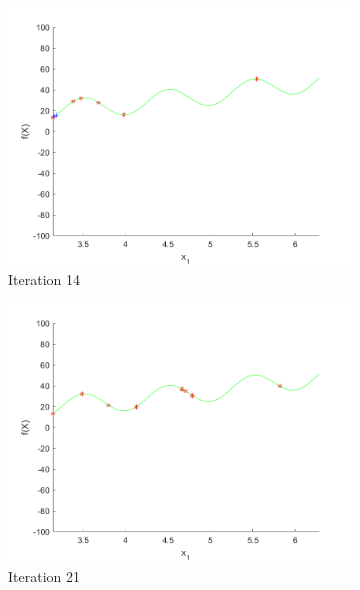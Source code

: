 \begin{figure}
\begin{subfigure}[b]{0.4\textwidth}
   \label{fig:i1-iter-1}
 \end{subfigure}
 \begin{subfigure}[b]{0.4\textwidth}
   \includegraphics[width=\textwidth]{img/smpl/rast1dshft/loa-iter-14}
   \caption{Iteration 14}
   \label{fig:i1-iter-2}
 \end{subfigure}
 \begin{subfigure}[b]{0.4\textwidth}
   \includegraphics[width=\textwidth]{img/smpl/rast1dshft/loa-iter-21}
   \caption{Iteration 21}
   \label{fig:i1-iter-3}
 \end{subfigure}
 \begin{subfigure}[b]{0.4\textwidth}

\end{subfigure}
\end{figure}
